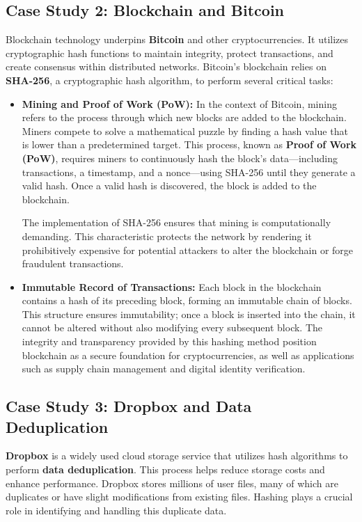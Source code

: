 \documentclass[11pt,a4paper]{article}
\begin{document}
    \subsection*{Case Study 2: Blockchain and Bitcoin}
    Blockchain technology underpins \textbf{Bitcoin} and other cryptocurrencies. It utilizes cryptographic hash functions to maintain integrity, protect transactions, and create consensus within distributed networks. Bitcoin's blockchain relies on \textbf{SHA-256}, a cryptographic hash algorithm, to perform several critical tasks:~\cite{Blockchain-Bitcoin}
        \begin{itemize}
            \item \textbf{Mining and Proof of Work (PoW):}
            \newline
            In the context of Bitcoin, mining refers to the process through which new blocks are added to the blockchain. Miners compete to solve a mathematical puzzle by finding a hash value that is lower than a predetermined target. This process, known as \textbf{Proof of Work (PoW)}, requires miners to continuously hash the block's data—including transactions, a timestamp, and a nonce—using SHA-256 until they generate a valid hash. Once a valid hash is discovered, the block is added to the blockchain.
            \par
            The implementation of SHA-256 ensures that mining is computationally demanding. This characteristic protects the network by rendering it prohibitively expensive for potential attackers to alter the blockchain or forge fraudulent transactions.


            \item \textbf{Immutable Record of Transactions:}
            \newline
            Each block in the blockchain contains a hash of its preceding block, forming an immutable chain of blocks. This structure ensures immutability; once a block is inserted into the chain, it cannot be altered without also modifying every subsequent block. The integrity and transparency provided by this hashing method position blockchain as a secure foundation for cryptocurrencies, as well as applications such as supply chain management and digital identity verification.

        \end{itemize}

    \subsection*{Case Study 3: Dropbox and Data Deduplication}
    \textbf{Dropbox} is a widely used cloud storage service that utilizes hash algorithms to perform \textbf{data deduplication}. This process helps reduce storage costs and enhance performance. Dropbox stores millions of user files, many of which are duplicates or have slight modifications from existing files. Hashing plays a crucial role in identifying and handling this duplicate data.
\end{document}
